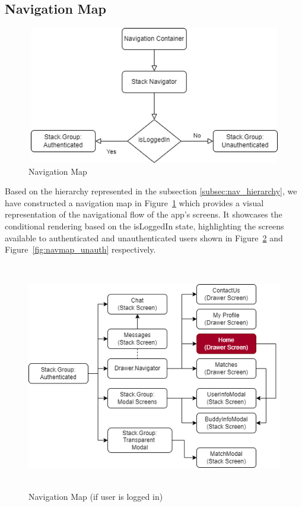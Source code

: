 \subsection{Navigation Map}
\begin{figure}[H]
	\centering
	\includegraphics[width=1\textwidth,width=10cm, height=6cm]{images/SB_nav_container.png}
	\caption{Navigation Map}
	\label{fig:navmap}
\end{figure}
Based on the hierarchy represented in the subsection \ref{subsec:nav_hierarchy}, we have constructed a navigation map in  Figure~\ref{fig:navmap} which provides a visual representation of the navigational flow of the app's screens. It showcases the conditional rendering based on the isLoggedIn state, highlighting the screens available to authenticated and unauthenticated users shown in Figure~\ref{fig:navmap_auth} and Figure~\ref{fig:navmap_unauth} respectively.
\begin{figure}[H]
	\centering
	\includegraphics[width=1\textwidth,width=15cm, height=10cm]{images/SB_auth.png}
	\caption{Navigation Map (if user is logged in)}
	\label{fig:navmap_auth}
\end{figure}
